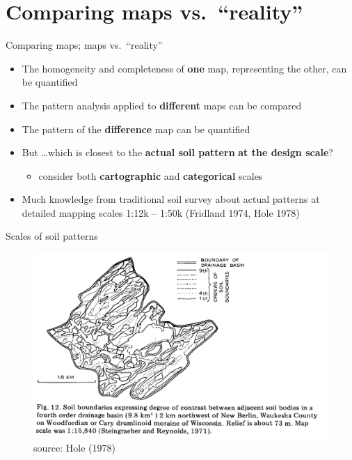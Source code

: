 \documentclass[aspectratio=169, 10pt]{beamer}
\begin{document}
  

\section{Comparing maps vs.\ ``reality''}

\begin{frame}{Comparing maps; maps vs.\ ``reality''}
    \begin{itemize}
        \item The homogeneity and completeness of \textbf{one} map, representing the other, can be quantified
        \item The pattern analysis applied to \textbf{different} maps can be compared
        \item The pattern of the \textbf{difference} map can be quantified
        \item But \ldots which is closest to the \textbf{actual soil pattern} \textbf{at the design scale}?
          \begin{itemize}
          \item consider both \textbf{cartographic} and \textbf{categorical} scales
          \end{itemize}
        \item Much knowledge from traditional soil survey about actual patterns at detailed mapping scales 1:12k -- 1:50k (Fridland 1974, Hole 1978)
    \end{itemize}
\end{frame}


\begin{frame}{Scales of soil patterns}
    \begin{figure}
        \centering
        \includegraphics[height=0.75\textheight]{graphics_david/10.1016.0016-7061(78)90002-2_Fig12.png}
\\source: Hole (1978)
    \end{figure}
\end{frame}
\end{document}
